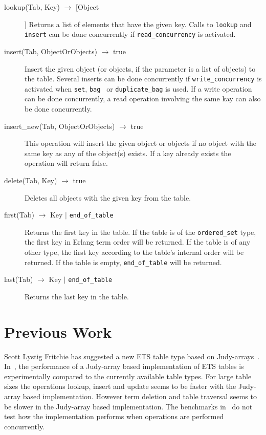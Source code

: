 \documentclass[aps,pre,preprint,nofootinbib]{revtex4}
\begin{document}
\begin{description}
 \item[lookup(Tab, Key) $\rightarrow$ [Object]] 
 Returns a list of elements that have the given key. 
 Calls to \verb|lookup| and \verb|insert| can be done concurrently if \verb|read_concurrency| is activated.
 \item[insert(Tab, ObjectOrObjects) $\rightarrow$ true]
 Insert the given object (or objects, if the parameter is a list of objects) to the table.
 Several inserts can be done concurrently if \verb|write_concurrency| is activated when \verb|set|, \verb|bag | or \verb|duplicate_bag| is used.
 If a write operation can be done concurrently, a read operation involving the same kay can also be done concurrently.
 \item[insert\_new(Tab, ObjectOrObjects) $\rightarrow$ true]
 This operation will insert the given object or objects if no object with the same key as any of the object(s) exists. 
 If a key already exists the operation will return false.
 \item[delete(Tab, Key) $\rightarrow$ true] Deletes all objects with the given key from the table.
 \item[first(Tab) $\rightarrow$ Key $|$ \texttt{end\_of\_table} ] Returns the first key in the table. If the table is of the \verb|ordered_set| type, the first key in Erlang term order will be returned. If the table is of any other type, the first key according to the table's internal order will be returned. If the table is empty, \verb|end_of_table| will be returned.
 \item[last(Tab) $\rightarrow$ Key $|$ \texttt{end\_of\_table} ] Returns the last key in the table.
\end{description}

\section{Previous Work}

  Scott Lystig Fritchie has suggested a new ETS table type based on Judy-arrays~\cite{ScottEtsJudy}.
  In~\cite{ScottEtsJudy}, the performance of a Judy-array based implementation of ETS tables is experimentally compared to the currently available table types.
  For large table sizes the operations lookup, insert and update seems to be faster with the Judy-array based implementation.
  However term deletion and table traversal seems to be slower in the Judy-array based implementation.
  The benchmarks in~\cite{ScottEtsJudy} do not test how the implementation performs when operations are performed concurrently.
  
\end{document}
